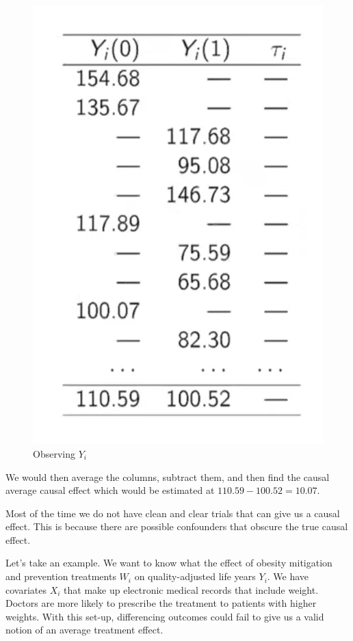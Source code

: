 \documentclass{article}
\begin{document}
\begin{figure}[H]
    \centering
    \includegraphics[scale = 0.3]{observe_RCT.png}
    \caption{Observing $Y_i$}
    \label{fig:observe_y}
\end{figure}

We would then average the columns, subtract them, and then find the causal average causal effect which would be estimated at $110.59 -100.52 = 10.07$.

Most of the time we do not have clean and clear trials that can give us a causal effect. This is because there are possible confounders that obscure the true causal effect.

Let's take an example. We want to know what the effect of obesity mitigation and prevention treatments $W_i$ on quality-adjusted life years $Y_i$. We have covariates $X_i$ that make up electronic medical records that include weight. Doctors are more likely to prescribe the treatment to patients with higher weights. With this set-up, differencing outcomes could fail to give us a valid notion of an average treatment effect.
\end{document}
